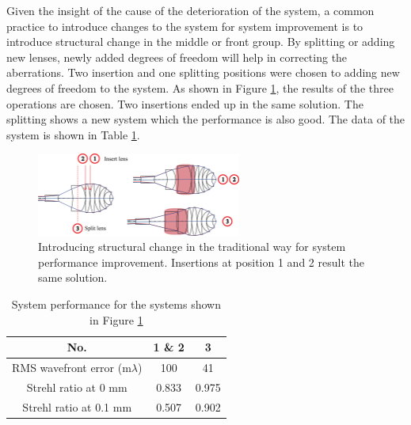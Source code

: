 Given the insight of the cause of the deterioration of the system, a common practice to introduce changes to the system for system improvement is to introduce structural change in the middle or front group. By splitting or adding new lenses, newly added degrees of freedom will help in correcting the aberrations. Two insertion and one splitting positions were chosen to adding new degrees of freedom to the system. As shown in Figure \ref{fig: vollrathWDTrad}, the results of the three operations are chosen. Two insertions ended up in the same solution. The splitting shows a new system which the performance is also good. The data of the system is shown in Table \ref{table: vollrathWDTrad}.

\begin{figure}[h!]
    \centering
    \includegraphics[width=0.6\textwidth]{chapter-4/figures/vollrathWDTrad.png}
    \caption{Introducing structural change in the traditional way for system performance improvement. Insertions at position \textcircled{\scriptsize{1}} and \textcircled{\scriptsize{2}} result the same solution. }
    \label{fig: vollrathWDTrad}
\end{figure}

\setlength{\arrayrulewidth}{.5mm}
\setlength{\tabcolsep}{18pt}
\renewcommand{\arraystretch}{1.2}
\begin{table}[h!]
    \centering
    \captionsetup{justification=centering}
    \caption{System performance for the systems shown in Figure \ref{fig: vollrathWDTrad}}
    \label{table: vollrathWDTrad}
    \vspace{-1em}
    \begin{adjustbox}{max width=\textwidth, center}
    \begin{tabular}{c c c}
    \hline 
     No. & \textbf{1 \& 2} & \textbf{3}  \\ 
     \midrule
    RMS wavefront error (m$\lambda$) & 100 & 41 \\ 
    Strehl ratio at 0 mm & 0.833 & 0.975 \\
    Strehl ratio at 0.1 mm & 0.507 & 0.902 \\
    \hline
    \end{tabular}
    \end{adjustbox}
\end{table}

